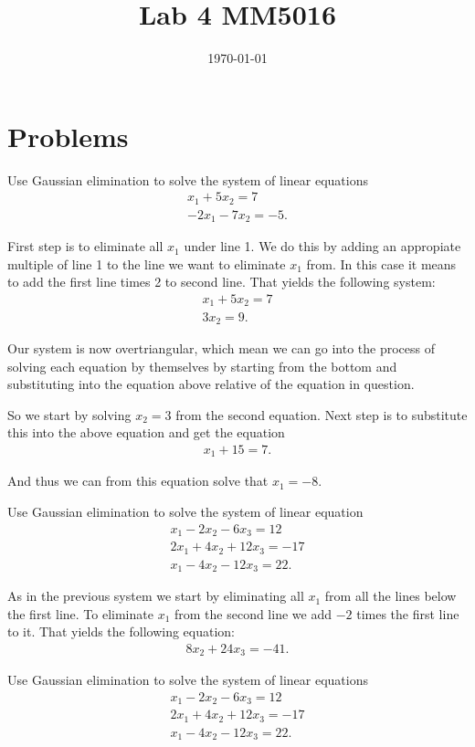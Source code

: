 \documentclass[10pt]{article}
\date{\today}
\title{Lab 4 MM5016}
\begin{document}
\maketitle


\section{Problems}
\label{sec:org8d3ae62}

\begin{exercise}[System 1]  \label{exe:System_1}
Use Gaussian elimination to solve the system of linear equations
\begin{align*}
x_1 + 5x_2 = 7 \\
-2x_1 -7x_2 = -5
.
\end{align*}
\end{exercise}
\begin{solution}[]  \label{sol:}
First step is to eliminate all \(x_1\) under line 1. We do this by
adding an appropiate multiple of line 1 to the line we
want to eliminate \(x_1\) from. In this case it means to add the first
line times 2 to second line. That yields the following system:
\begin{align*}
x_1 + 5x_2 = 7 \\
3x_2 = 9
.
\end{align*}

Our system is now overtriangular, which mean we can go into
the process of solving each equation by themselves by starting
from the bottom and substituting into the equation above
relative of the equation in question.


So we start by solving \(x_2 = 3\) from the second equation. Next step is
to substitute this into the above equation and get the equation
\begin{align*}
x_1 + 15 = 7
.
\end{align*}

And thus we can from this equation solve that \(x_1 = -8\).

\end{solution}
\begin{exercise}[System 2]  \label{exe:System_2}
Use Gaussian elimination to solve the system of linear equation
\begin{align*}
x_1 - 2x_2 - 6x_3 = 12 \\
2x_1 + 4x_2 + 12x_3 = -17 \\
x_1 - 4x_2 - 12x_3 = 22
.
\end{align*}
\end{exercise}
\begin{solution}[]  \label{sol:}
As in the previous system we start by eliminating all \(x_1\) from
all the lines below the first line.
To eliminate \(x_1\) from the second line we add \(-2\) times the first line
to it. That yields the following equation:
\begin{align*}
8x_2 + 24x_3 = -41
.
\end{align*}

\end{solution}
\begin{exercise}[System 3]  \label{exe:System_3}
Use Gaussian elimination to solve the system of linear equations
\begin{align*}
x_1 - 2x_2 -6x_3 = 12 \\
2x_1 + 4x_2 + 12x_3 = -17 \\
x_1 - 4x_2 - 12x_3 = 22
.
\end{align*}
\end{exercise}
\end{document}

